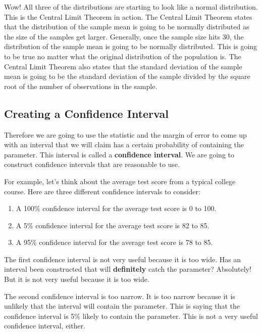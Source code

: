 \documentclass[
  letterpaper,
  DIV=11,
  numbers=noendperiod]{scrreprt}
\begin{document}
Wow! All three of the distributions are starting to look like a normal
distribution. This is the Central Limit Theorem in action. The Central
Limit Theorem states that the distribution of the sample mean is going
to be normally distributed as the size of the samples get larger.
Generally, once the sample size hits 30, the distribution of the sample
mean is going to be normally distributed. This is going to be true no
matter what the original distribution of the population is. The Central
Limit Theorem also states that the standard deviation of the sample mean
is going to be the standard deviation of the sample divided by the
square root of the number of observations in the sample.

\subsection*{Creating a Confidence
Interval}\label{creating-a-confidence-interval}

Therefore we are going to use the statistic and the margin of error to
come up with an interval that we will claim has a certain probability of
containing the parameter. This interval is called a \textbf{confidence
interval}. We are going to construct confidence intervals that are
reasonable to use.

For example, let's think about the average test score from a typical
college course. Here are three different confidence intervals to
consider:

\begin{enumerate}
\def\labelenumi{\arabic{enumi}.}
\item
  A 100\% confidence interval for the average test score is 0 to 100.
\item
  A 5\% confidence interval for the average test score is 82 to 85.
\item
  A 95\% confidence interval for the average test score is 78 to 85.
\end{enumerate}

The first confidence interval is not very useful because it is too wide.
Has an interval been constructed that will \textbf{definitely} catch the
parameter? Absolutely! But it is not very useful because it is too wide.

The second confidence interval is too narrow. It is too narrow because
it is unlikely that the interval will contain the parameter. This is
saying that the confidence interval is 5\% likely to contain the
parameter. This is not a very useful confidence interval, either.
\end{document}
